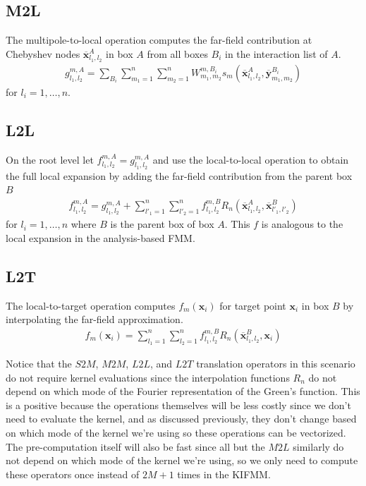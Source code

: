 \documentclass[11pt, oneside]{article}   	%
\begin{document}
\subsection{M2L}
The multipole-to-local operation computes the far-field contribution at Chebyshev nodes $\mathbf{\overline{x}}_{l_1,l_2}^A$ in box $A$ from all boxes $B_i$ in the interaction list of $A$.
\begin{align}
g_{l_1,l_2}^{m,A} = \sum_{B_i} \sum_{m_1=1}^n\sum_{m_2=1}^n W_{m_1,m_2}^{m,B_i} s_m(\mathbf{\overline{x}}^{A}_{l_1,l_2},\mathbf{\overline{y}}^{B_i}_{m_1,m_2})
\end{align}
for $l_i = 1,\dots,n$.
\subsection{L2L}
On the root level let $f^{m,A}_{l_1,l_2}=g^{m,A}_{l_1,l_2}$ and use the local-to-local operation to obtain the full local expansion by adding the far-field contribution from the parent box $B$
\begin{align}
f^{m,A}_{l_1,l_2}=g^{m,A}_{l_1,l_2} + \sum_{l'_1=1}^n \sum_{l'_2=1}^n f^{m,B}_{l_1,l_2} R_n(\mathbf{\overline{x}}_{l_1,l_2}^A,\mathbf{\overline{x}}_{l'_1,l'_2}^B)
\end{align}
for $l_i = 1,\dots,n$ where $B$ is the parent box of box $A$. This $f$ is analogous to the local expansion in the analysis-based FMM.
\subsection{L2T}
The local-to-target operation computes $f_m(\mathbf{x}_i)$ for target point $\mathbf{x}_i$ in box $B$ by interpolating the far-field approximation.
\begin{align}
f_m(\mathbf{x}_i)=\sum_{l_1=1}^n \sum_{l_2=1}^n f^{m,B}_{l_1,l_2} R_n(\mathbf{\overline{x}}_{l_1,l_2}^B,\mathbf{x}_i)
\end{align}

Notice that the $S2M$, $M2M$, $L2L$, and $L2T$ translation operators in this scenario do not require kernel evaluations since the interpolation functions $R_n$ do not depend on which mode of the Fourier representation of the Green's function. This is a positive because the operations themselves will be less costly since we don't need to evaluate the kernel, and as discussed previously, they don't change based on which mode of the kernel we're using so these operations can be vectorized. The pre-computation itself will also be fast since all but the $M2L$ similarly do not depend on which mode of the kernel we're using, so we only need to compute these operators once instead of $2M+1$ times in the KIFMM.
\end{document}
